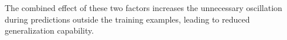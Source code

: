 The combined effect of these two factors increases the unnecessary oscillation during predictions outside the training examples, leading to reduced generalization capability. %


